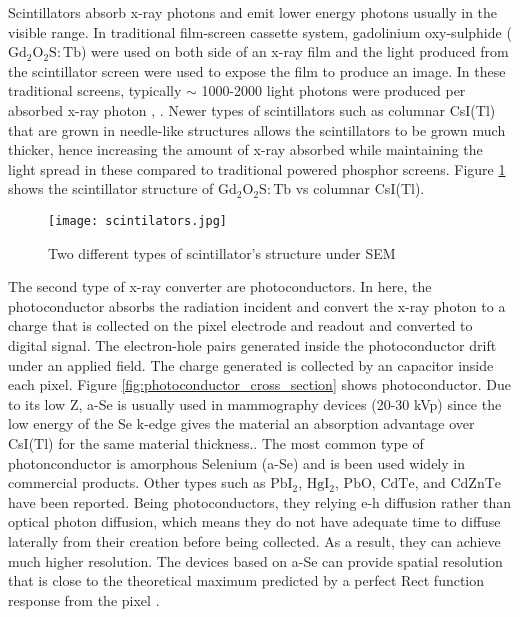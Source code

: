 Scintillators absorb x-ray photons and emit lower energy photons usually in the visible range.  In traditional film-screen cassette system, gadolinium oxy-sulphide ($\mathrm{Gd_2O_2S:Tb}$) were used on both side of an x-ray film and the light produced from the scintillator screen were used to expose the film to produce an image.  In these traditional screens, typically $\sim$ 1000-2000 light photons were produced per absorbed x-ray photon \cite{trauernicht1988}, \cite{trauernicht1990}. Newer types of scintillators such as columnar CsI(Tl) that are grown in needle-like structures allows the scintillators to be grown much thicker, hence increasing the amount of x-ray absorbed while maintaining the light spread in these compared to traditional powered phosphor screens.  Figure \ref{fig:scintillators} shows the scintillator structure of $\mathrm{Gd_2O_2S:Tb}$ vs columnar CsI(Tl).

\begin{figure}
\texttt{[image: scintilators.jpg]}
\label{fig:scintillators}
\caption{Two different types of scintillator's structure under SEM}
\end{figure}

The second type of x-ray converter are photoconductors.  In here,  the photoconductor absorbs the radiation incident and convert the x-ray photon to a charge that is collected on the pixel electrode and readout and converted to digital signal.  The electron-hole pairs generated inside the photoconductor drift under an applied field.  The charge generated is collected by an capacitor inside each pixel. Figure \ref{fig:photoconductor_cross_section} shows photoconductor.  Due to its low Z, a-Se is usually used in mammography devices (20-30 kVp) since the low energy of the Se k-edge gives the material an absorption advantage over CsI(Tl) for the same material thickness.\cite{Yorkston2007}.  The most common type of photonconductor is amorphous Selenium (a-Se) and is been used widely in commercial products.  Other types such as $\mathrm{PbI_2}$, $\mathrm{HgI_2}$, $\mathrm{PbO}$, $\mathrm{CdTe}$, and $\mathrm{CdZnTe}$ have been reported.  Being photoconductors, they relying e-h diffusion rather than optical photon diffusion, which means they do not have adequate time to diffuse laterally from their creation before being collected.  As a result, they can achieve much higher resolution.  The devices based on a-Se can provide spatial resolution that is close to the theoretical maximum predicted by a perfect Rect function response from the pixel \cite{hunt5030}. 

